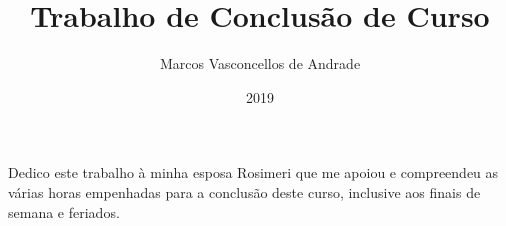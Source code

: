 \documentclass[tsi]{ifbclass/ifbclass}
\title{Trabalho de Conclusão de Curso}
\date{2019}
\author{Marcos Vasconcellos de Andrade}
\begin{document}
\frontmatter

\frontpage

\presentationpage

\begin{fichacatalografica}
  \FakeFichaCatalografica
\end{fichacatalografica}

\banca

\begin{dedicatory} %
Dedico este trabalho à minha esposa Rosimeri que me apoiou e compreendeu as
várias horas empenhadas para a conclusão deste curso, inclusive aos finais
de semana e feriados.
\end{dedicatory}
  
\acknowledgements %


%

\resumo
{\parindent0pt
  
}
  
\abstract
{\parindent0pt
  
}

\listoffigures

\lstlistoflistings

\listoftables

\listofacronyms


\tableofcontents

\mainmatter








\begin{references}
  
\end{references}


\theappendix

%
\end{document}
